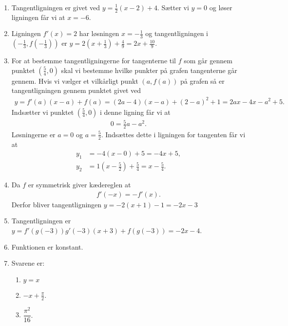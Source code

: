 \begin{enumerate}
	
	\item Tangentligningen er givet ved $y=\frac{1}{2}(x-2)+4$. Sætter vi $y=0$ og løser ligningen får vi at $x=-6$.
	
	\item Ligningen $f'(x)=2$ har løsningen $x=-\frac{1}{3}$ og tangentligningen i $ (-\frac{1}{3},f(-\frac{1}{3})) $ er $ y=2(x+\frac{1}{3}) +\frac{4}{9}=2x+\frac{10}{9}$.
	
	
	\item For at bestemme tangentligningerne for tangenterne til $f$ som går gennem punktet $(\frac{5}{4},0)$ skal vi bestemme hvilke punkter på grafen tangenterne går gennem. Hvis vi vælger et vilkårligt punkt $ (a,f(a)) $ på grafen så er tangentligningen gennem punktet givet ved
	\begin{align*}
	y=f'(a)(x-a)+f(a)=(2a-4)(x-a)+(2-a)^2+1=2ax-4x-a^2+5.
	\end{align*}
	Indsætter vi punktet $(\frac{5}{4},0)$ i denne ligning får vi at
	\begin{align*}
	0=\frac{5}{2}a-a^2.
	\end{align*}
	Løsningerne er $a=0$ og $a=\frac{5}{2}$. Indsættes dette i ligningen for tangenten får vi at
	\begin{align*}
	y_1&=-4(x-0)+5=-4x+5,\\
	y_2&=1(x-\frac{5}{2}) +\frac{5}{4}=x-\frac{5}{4}.
	\end{align*}
	
	
	\item Da $f$ er symmetrisk giver kædereglen at
	\begin{align*}
	f'(-x)=-f'(x).
	\end{align*}
	Derfor bliver tangentligningen $y= -2(x+1)-1=-2x-3$
	
	\item Tangentligningen er $y=f'(g(-3))g'(-3)(x+3)+f(g(-3))=-2x-4$.
	
	\item Funktionen er konstant.
	
	\item Svarene er:
	\begin{enumerate}
		\item $y=x$
		\item $-x+\frac{\pi}{2}$.
		\item $\dfrac{\pi^2}{16}$.
	\end{enumerate}


\end{enumerate}